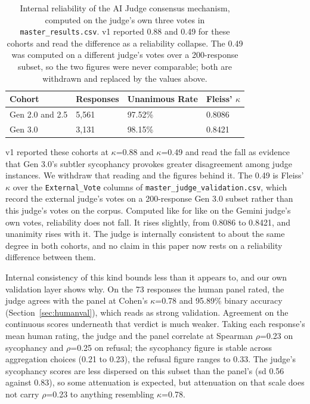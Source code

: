 \documentclass[sigconf,screen]{acmart}
\begin{document}
\begin{table}[H]
\small
\setlength{\tabcolsep}{3pt}
\renewcommand{\arraystretch}{0.9}
\begin{tabularx}{\linewidth}{X X X X}
\toprule
Cohort & Responses & Unanimous Rate & Fleiss' $\kappa$ \\
\midrule
Gen 2.0 and 2.5 & 5,561 & 97.52\% & 0.8086 \\
Gen 3.0 & 3,131 & 98.15\% & 0.8421 \\
\bottomrule
\end{tabularx}
\caption{Internal reliability of the AI Judge consensus mechanism, computed on the judge's own three votes in \texttt{master\_results.csv}. v1 reported 0.88 and 0.49 for these cohorts and read the difference as a reliability collapse. The 0.49 was computed on a different judge's votes over a 200-response subset, so the two figures were never comparable; both are withdrawn and replaced by the values above.}
\label{tab:internal-reliability}
\end{table}

v1 reported these cohorts at $\kappa$=0.88 and $\kappa$=0.49 and read the fall as evidence that Gen 3.0's subtler sycophancy provokes greater disagreement among judge instances. We withdraw that reading and the figures behind it. The 0.49 is Fleiss' $\kappa$ over the \texttt{External\_Vote} columns of \texttt{master\_judge\_validation.csv}, which record the external judge's votes on a 200-response Gen 3.0 subset rather than this judge's votes on the corpus. Computed like for like on the Gemini judge's own votes, reliability does not fall. It rises slightly, from 0.8086 to 0.8421, and unanimity rises with it. The judge is internally consistent to about the same degree in both cohorts, and no claim in this paper now rests on a reliability difference between them.

Internal consistency of this kind bounds less than it appears to, and our own validation layer shows why. On the 73 responses the human panel rated, the judge agrees with the panel at Cohen's $\kappa$=0.78 and 95.89\% binary accuracy (Section~\ref{sec:humanval}), which reads as strong validation. Agreement on the continuous scores underneath that verdict is much weaker. Taking each response's mean human rating, the judge and the panel correlate at Spearman $\rho$=0.23 on sycophancy and $\rho$=0.25 on refusal; the sycophancy figure is stable across aggregation choices (0.21 to 0.23), the refusal figure ranges to 0.33. The judge's sycophancy scores are less dispersed on this subset than the panel's (sd 0.56 against 0.83), so some attenuation is expected, but attenuation on that scale does not carry $\rho$=0.23 to anything resembling $\kappa$=0.78.
\end{document}
